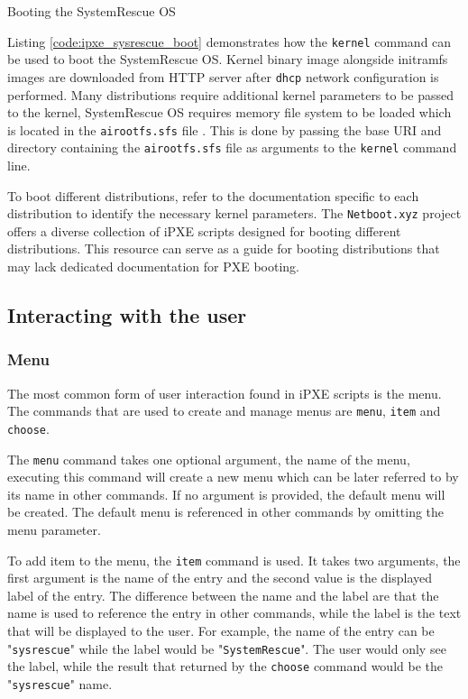 \documentclass[../main.tex]{subfiles}
\begin{document}
\begin{listing}[H]
  \caption{Booting the SystemRescue\cite{sysrescuecd} OS}
  \label{code:ipxe_sysrescue_boot}
\end{listing}

Listing \ref{code:ipxe_sysrescue_boot} demonstrates how the \texttt{kernel} command can be used to boot the SystemRescue OS.
Kernel binary image alongside initramfs images are downloaded from HTTP server after \texttt{dhcp} network configuration is performed.
Many distributions require additional kernel parameters to be passed to the kernel, SystemRescue OS requires
memory file system to be loaded which is located in the \texttt{airootfs.sfs} file \cite{systemrescue_airootfs_pxe}.
This is done by passing the base URI and directory containing the \texttt{airootfs.sfs} file as arguments to the \texttt{kernel} command line.


To boot different distributions, refer to the documentation specific to each distribution to identify the necessary kernel parameters.
The \texttt{Netboot.xyz} project \cite{netbootxyz} offers a diverse collection of iPXE scripts designed for booting different distributions.
This resource can serve as a guide for booting distributions that may lack dedicated documentation for PXE booting.

\subsection{Interacting with the user}

\subsubsection{Menu}

The most common form of user interaction found in iPXE scripts is the menu.
The commands that are used to create and manage menus are \texttt{menu}, \texttt{item} and \texttt{choose}.

The \texttt{menu} command takes one optional argument, the name of the menu, executing this command will create a new menu which can be later referred to by its name in other commands.
If no argument is provided, the default menu will be created. The default menu is referenced in other commands by omitting the menu parameter.


To add item to the menu, the \texttt{item} command is used. It takes two arguments, the first argument is the name of the entry and the second value is the displayed label of the entry.
The difference between the name and the label are that the name is used to reference the entry in other commands, while the label is the text that will be displayed to the user.
For example, the name of the entry can be "\texttt{sysrescue}" while the label would be "\texttt{SystemRescue}". The user would only see the label, while
the result that returned by the \texttt{choose} command would be the "\texttt{sysrescue}" name.
\end{document}
